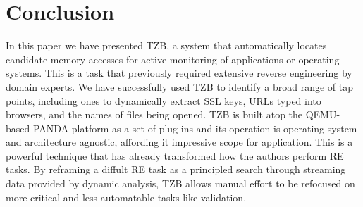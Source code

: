 \section{Conclusion}
\label{sec:conclusion}

In this paper we have presented TZB, a system that automatically locates
candidate memory accesses for active monitoring of applications or operating
systems. This is a task that previously required extensive reverse engineering
by domain experts. We have successfully used TZB to identify a broad range of
tap points, including ones to dynamically extract SSL keys, URLs typed into
browsers, and the names of files being opened. TZB is built atop the QEMU-based
PANDA platform as a set of plug-ins and its operation is operating system and
architecture agnostic, affording it impressive scope for application. This is a
powerful technique that has already transformed how the authors perform RE
tasks. By reframing a diffult RE task as a principled search through streaming
data provided by dynamic analysis, TZB allows manual effort to be refocused on
more critical and less automatable tasks like validation.
